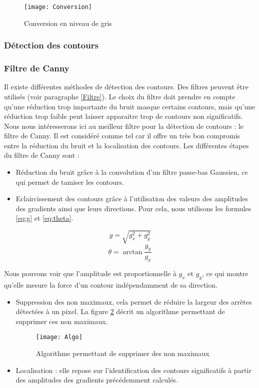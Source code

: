 \begin{figure}[h]
  \centering
  \texttt{[image: Conversion]}
  \caption{Conversion en niveau de gris}
  \label{fig:Conversion}
\end{figure}

\subsubsection{Détection des contours}

\subsubsection*{Filtre de Canny}

Il existe différentes méthodes de détection des contours. Des filtres peuvent être utilisés (voir paragraphe \ref{Filtre}). Le choix du filtre doit prendre en compte qu’une réduction trop importante du bruit masque certains contours, mais qu’une réduction trop faible peut laisser apparaitre trop de contours non significatifs. Nous nous intéresserons ici au meilleur filtre pour la détection de contours : le filtre de Canny. Il est considéré comme tel car il offre un très bon compromis entre la réduction du bruit et la localisation des contours. Les différentes étapes du filtre de Canny sont :
\begin{itemize}[label=\textbullet,font=\color{black}]
\item Réduction du bruit grâce à la convolution d’un filtre passe-bas Gaussien, ce qui permet de tamiser les contours.
\item Eclaircissement des contours grâce à l’utilisation des valeurs des amplitudes des gradients ainsi que leurs directions. Pour cela, nous utilisons les formules \eqref{eq:g} et \eqref{eq:theta}.
\end{itemize}

\begin{equation}
g = \sqrt{g_x^2 + g_y^2}
\label{eq:g}
\end{equation}
\begin{equation}
\theta = \arctan{\frac{g_y}{g_x}}
\label{eq:theta}
\end{equation}

Nous pouvons voir que l’amplitude est proportionnelle à $g_x$ et $g_y$, ce qui montre qu’elle mesure la force d’un contour indépendamment de sa direction. 
\begin{itemize}[label=\textbullet,font=\color{black}]
\item Suppression des non maximaux, cela permet de réduire la largeur des arrêtes détectées à un pixel. La figure \ref{fig:Algo} décrit un algorithme permettant de supprimer ces non maximaux.
\begin{figure}[h]
  \centering
  \texttt{[image: Algo]}
  \caption{Algorithme permettant de supprimer des non maximaux}
  \label{fig:Algo}
\end{figure}
\item Localisation : elle repose sur l’identification des contours significatifs à partir des amplitudes des gradients précédemment calculés. 
\end{itemize}


